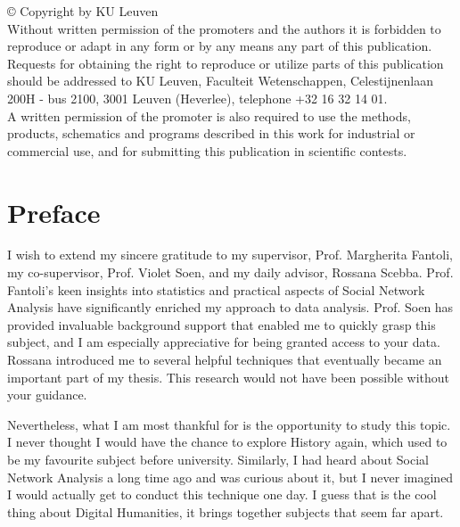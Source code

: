 \documentclass[12pt,a4paper,oneside]{book}
\begin{document}
\begin{sloppypar}

\rmfamily

\mbox{}
\vfill
\noindent
© Copyright by KU Leuven
\\

\noindent
Without written permission of the promoters and the authors it is forbidden to reproduce or adapt in any form or by any means any part of this publication. Requests for obtaining the right to reproduce or utilize parts of this publication should be addressed to KU Leuven, Faculteit Wetenschappen, Celestijnenlaan 200H - bus 2100, 3001 Leuven (Heverlee), telephone +32 16 32 14 01.
\\

\noindent
A written permission of the promoter is also required to use the methods, products, schematics and programs described in this work for industrial or commercial use, and for submitting this publication in scientific contests.
\thispagestyle{empty}
\pagebreak

\setcounter{page}{0}

\chapter*{Preface}
\label{preface}
I wish to extend my sincere gratitude to my supervisor, Prof. Margherita Fantoli, my co-supervisor, Prof. Violet Soen, and my daily advisor, Rossana Scebba. Prof. Fantoli's keen insights into statistics and practical aspects of Social Network Analysis have significantly enriched my approach to data analysis. Prof. Soen has provided invaluable background support that enabled me to quickly grasp this subject, and I am especially appreciative for being granted access to your data. Rossana introduced me to several helpful techniques that eventually became an important part of my thesis. This research would not have been possible without your guidance.

Nevertheless, what I am most thankful for is the opportunity to study this topic. I never thought I would have the chance to explore History again, which used to be my favourite subject before university. Similarly, I had heard about Social Network Analysis a long time ago and was curious about it, but I never imagined I would actually get to conduct this technique one day. I guess that is the cool thing about Digital Humanities, it brings together subjects that seem far apart.


\end{sloppypar}
\end{document}

